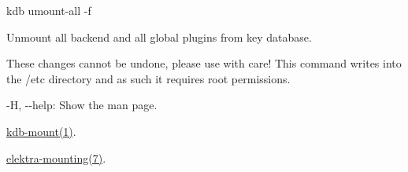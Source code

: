 {\ttfamily kdb umount-\/all -\/f}

Unmount all backend and all global plugins from key database.

These changes cannot be undone, please use with care! This command writes into the {\ttfamily /etc} directory and as such it requires root permissions.


\begin{DoxyItemize}
\item {\ttfamily -\/H}, {\ttfamily -\/-\/help}\+: Show the man page.
\end{DoxyItemize}


\begin{DoxyItemize}
\item \mbox{\hyperlink{doc_help_kdb-mount_md}{kdb-\/mount(1)}}.
\item \mbox{\hyperlink{doc_help_elektra-mounting_md}{elektra-\/mounting(7)}}. 
\end{DoxyItemize}
